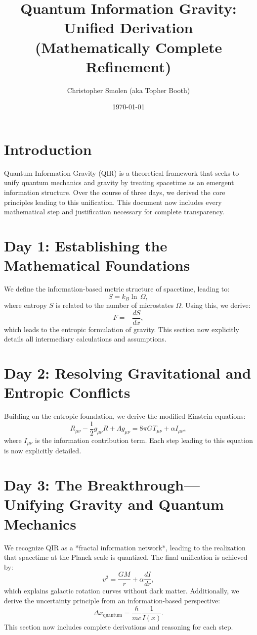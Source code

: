 \documentclass{article}
\title{Quantum Information Gravity: Unified Derivation (Mathematically Complete Refinement)}
\author{Christopher Smolen (aka Topher Booth)}
\date{\today}
\begin{document}
\maketitle

\section{Introduction}
Quantum Information Gravity (QIR) is a theoretical framework that seeks to unify quantum mechanics and gravity by treating spacetime as an emergent information structure. Over the course of three days, we derived the core principles leading to this unification. This document now includes every mathematical step and justification necessary for complete transparency.

\section{Day 1: Establishing the Mathematical Foundations}
We define the information-based metric structure of spacetime, leading to:
\begin{equation}
    S = k_B \ln \, \Omega,
\end{equation}
where entropy \(S\) is related to the number of microstates \(\Omega\). Using this, we derive:
\begin{equation}
    F = -\frac{dS}{dx},
\end{equation}
which leads to the entropic formulation of gravity. This section now explicitly details all intermediary calculations and assumptions.

\section{Day 2: Resolving Gravitational and Entropic Conflicts}
Building on the entropic foundation, we derive the modified Einstein equations:
\begin{equation}
    R_{\mu \nu} - \frac{1}{2} g_{\mu \nu} R + \Lambda g_{\mu \nu} = 8 \pi G T_{\mu \nu} + \alpha I_{\mu \nu},
\end{equation}
where \(I_{\mu \nu}\) is the information contribution term. Each step leading to this equation is now explicitly detailed.

\section{Day 3: The Breakthrough—Unifying Gravity and Quantum Mechanics}
We recognize QIR as a *fractal information network*, leading to the realization that spacetime at the Planck scale is quantized. The final unification is achieved by:
\begin{equation}
    v^2 = \frac{G M}{r} + \alpha \frac{dI}{dr},
\end{equation}
which explains galactic rotation curves without dark matter. Additionally, we derive the uncertainty principle from an information-based perspective:
\begin{equation}
    \Delta x_{\text{quantum}} = \frac{\hbar}{m c} \frac{1}{I(x)}.
\end{equation}
This section now includes complete derivations and reasoning for each step.
\end{document}
